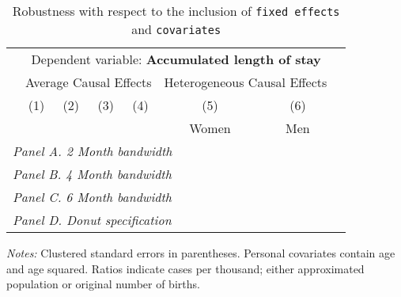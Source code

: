  \begin{table}[H] \begin{threeparttable} \centering \caption{Robustness with respect to the inclusion of \texttt{fixed effects} and \texttt{covariates}} {\def\sym#1{\ifmmode^{#1}\else\(^{#1}\)\fi} \begin{tabular}{l*{7}{c}} \toprule & \multicolumn{6}{c}{Dependent variable: \textbf{Accumulated length of stay}} \\ \cmidrule(lr){2-7}
            &\multicolumn{4}{c}{Average Causal Effects}         &\multicolumn{2}{c}{Heterogeneous Causal Effects}\\\cmidrule(lr){2-5}\cmidrule(lr){6-7}
            &\multicolumn{1}{c}{(1)}&\multicolumn{1}{c}{(2)}&\multicolumn{1}{c}{(3)}&\multicolumn{1}{c}{(4)}&\multicolumn{1}{c}{(5)}&\multicolumn{1}{c}{(6)}\\
            &\multicolumn{1}{c}{}&\multicolumn{1}{c}{}&\multicolumn{1}{c}{}&\multicolumn{1}{c}{}&\multicolumn{1}{c}{Women}&\multicolumn{1}{c}{Men}\\
\midrule
 \multicolumn{7}{l}{\emph{Panel A. 2 Month bandwidth}} \\    \midrule\multicolumn{7}{l}{\emph{Panel B. 4 Month bandwidth}} \\    \midrule\multicolumn{7}{l}{\emph{Panel C. 6 Month bandwidth}} \\    \midrule\multicolumn{7}{l}{\emph{Panel D. Donut specification}} \\    \midrule  
\bottomrule \end{tabular} } \begin{tablenotes} \item \scriptsize \emph{Notes:} Clustered standard errors in parentheses. Personal covariates contain age and age squared. Ratios indicate cases per thousand; either approximated population or original number of births. \end{tablenotes} \end{threeparttable} \end{table} 
